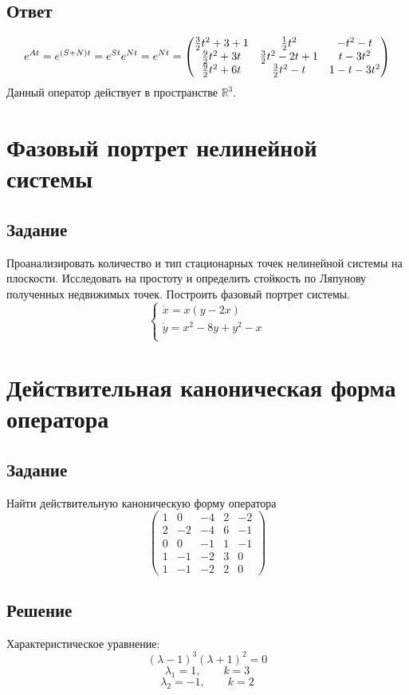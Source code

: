 \documentclass[a4paper,10pt,notitlepage,pdftex,headsepline]{scrartcl}
\begin{document}
\subsection*{Ответ}
\[e^{A t} = e^{(S + N) t} = e^{S t} e^{N t} = e^{N t} = \left(\begin{matrix}
\strut\frac{3}{2} t^2 + 3 + 1 & \frac{1}{2} t^2           & -t^2 - t\\
\frac{9}{2} t^2 + 3 t   & \frac{3}{2} t^2 - 2 t + 1 & t - 3 t^2\\
\frac{9}{2} t^2 + 6 t   & \frac{3}{2} t^2 - t       & 1 - t - 3 t^2
\end{matrix}\right)\]
Данный оператор действует в пространстве $\mathbb{R}^3$.
\newpage
\section{Фазовый портрет нелинейной системы}
\subsection*{Задание}
Проанализировать количество и тип стационарных точек нелинейной системы на плоскости.
Исследовать на простоту и определить стойкость по Ляпунову полученных недвижимых точек.
Построить фазовый портрет системы.
\[
\begin{cases}
\dot{x} = x(y - 2x)\\
\dot{y} = x^2 - 8 y + y^2 - x\\
\end{cases}
\]
\newpage
\section{Действительная каноническая форма оператора}
\subsection*{Задание}
Найти действительную каноническую форму оператора
\[
\left(
\begin{matrix}
1 & 0 & -4 & 2 & -2\\
2 & -2 & -4 & 6 & -1\\
0 & 0 & -1 & 1 & -1\\
1 & -1 & -2 & 3 & 0\\
1 & -1 & -2 & 2 & 0
\end{matrix}
\right)
\]
\subsection*{Решение}
Характеристическое уравнение:
\[
(\lambda - 1)^3 (\lambda + 1)^2 = 0
\]
\[
\lambda_1 = 1, \qquad k = 3
\]
\[
\lambda_2 = -1, \qquad k = 2
\]
\end{document}
